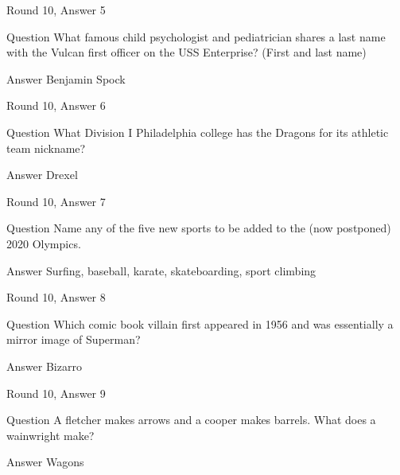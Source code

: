 \documentclass[11pt]{beamer}
\begin{document}
\begin{frame}[t]{Round 10, Answer 5}
\vspace{2em}
\begin{block}{Question}
What famous child psychologist and pediatrician shares a last name with the Vulcan first officer on the USS Enterprise? (First and last name)
\end{block}
\pause{}
\begin{block}{Answer}
Benjamin Spock
\end{block}
\end{frame}
    

\begin{frame}[t]{Round 10, Answer 6}
\vspace{2em}
\begin{block}{Question}
What Division I Philadelphia college has the Dragons for its athletic team nickname\@?
\end{block}
\pause{}
\begin{block}{Answer}
Drexel
\end{block}
\end{frame}
    

\begin{frame}[t]{Round 10, Answer 7}
\vspace{2em}
\begin{block}{Question}
Name any of the five new sports to be added to the (now postponed) 2020 Olympics.
\end{block}
\pause{}
\begin{block}{Answer}
Surfing, baseball, karate, skateboarding, sport climbing
\end{block}
\end{frame}
    

\begin{frame}[t]{Round 10, Answer 8}
\vspace{2em}
\begin{block}{Question}
Which comic book villain first appeared in 1956 and was essentially a mirror image of Superman\@?
\end{block}
\pause{}
\begin{block}{Answer}
Bizarro
\end{block}
\end{frame}
    

\begin{frame}[t]{Round 10, Answer 9}
\vspace{2em}
\begin{block}{Question}
A fletcher makes arrows and a cooper makes barrels. What does a wainwright make\@?
\end{block}
\pause{}
\begin{block}{Answer}
Wagons
\end{block}
\end{frame}
    
\end{document}
